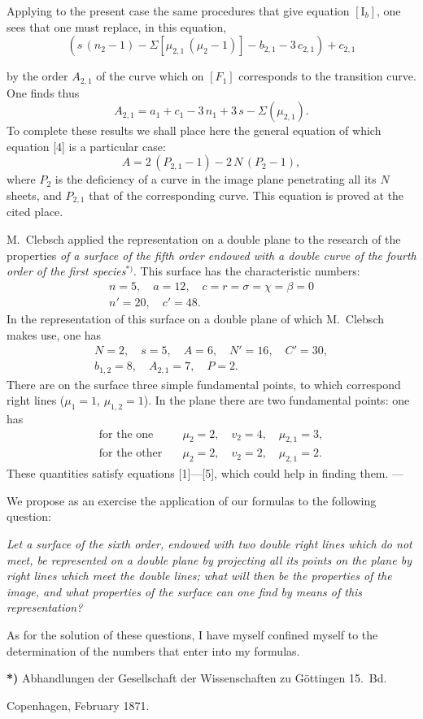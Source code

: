 \documentclass{article}
\begin{document}
Applying to the present case the same procedures that give equation $[\mathrm{I}_b]$, one sees that one must replace, in this equation,
\[
(s\,(n_2 - 1) - \Sigma[\mu_{2, 1}\,(\mu_2 - 1)] - b_{2, 1} - 3\,c_{2, 1}) + c_{2, 1}
\]

by the order $A_{2, 1}$ of the curve which on $[F_1]$ corresponds to the transition curve. One finds thus
\[
A_{2, 1} = a_1 + c_1 - 3\,n_1 + 3\,s - \Sigma(\mu_{2, 1}). \tag*{[5]}
\]
To complete these results we shall place here the general equation of which equation [4] is a particular case:
\[
A = 2\,(P_{2, 1} - 1) - 2\,N\,(P_2 - 1),
\]
where $P_2$ is the deficiency of a curve in the image plane penetrating all its $N$ sheets, and $P_{2, 1}$ that of the corresponding curve. This equation is proved at the cited place.

M.~Clebsch applied the representation on a double plane to the research of the properties \emph{of a surface of the fifth order endowed with a double curve of the fourth order of the first species}${}^{*)}$. This surface has the characteristic numbers:
\[
\begin{gathered}
n = 5, \quad a = 12, \quad c = r = \sigma = \chi = \beta = 0 \\
n' = 20, \quad c' = 48.
\end{gathered}
\]
In the representation of this surface on a double plane of which M.~Clebsch makes use, one has
\[
\begin{gathered}
N = 2, \quad s = 5, \quad A = 6, \quad N' = 16, \quad C' = 30, \\
b_{1, 2} = 8, \quad A_{2, 1} = 7, \quad P = 2.
\end{gathered}
\]
There are on the surface three simple fundamental points, to which correspond right lines ($\mu_1 = 1$, $\mu_{1, 2} = 1$). In the plane there are two fundamental points: one has
\[
\begin{aligned}
\text{for the one} \quad &\mu_2 = 2, \quad v_2 = 4, \quad \mu_{2, 1} = 3, \\
\text{for the other} \quad &\mu_2 = 2, \quad v_2 = 2, \quad \mu_{2, 1} = 2.
\end{aligned}
\]
These quantities satisfy equations [1]---[5], which could help in finding them. ---

We propose as an exercise the application of our formulas to the following question:

\emph{Let a surface of the sixth order, endowed with two double right lines which do not meet, be represented on a double plane by projecting all its points on the plane by right lines which meet the double lines; what will then be the properties of the image, and what properties of the surface can one find by means of this representation?}

As for the solution of these questions, I have myself confined myself to the determination of the numbers that enter into my formulas.

\textbf{*)} Abhandlungen der Gesellschaft der Wissenschaften zu Göttingen 15.~Bd.

Copenhagen, February 1871.
\end{document}
